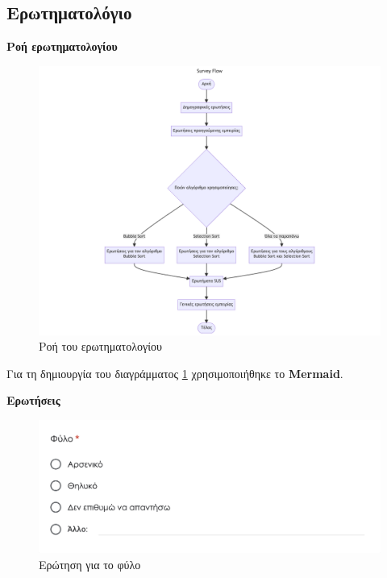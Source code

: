 {}
\subsection*{Ερωτηματολόγιο}


\textbf{Ροή ερωτηματολογίου}

\begin{figure}[H]
    \centering
    \includegraphics[width=1\linewidth]{sections/appendices/b/images/survey_flow}
    \caption{Ροή του ερωτηματολογίου}
    \label{fig:survey_flow}
\end{figure}

Για τη δημιουργία του διαγράμματος \ref{fig:survey_flow} χρησιμοποιήθηκε το \textbf{Mermaid}\cite{noauthor_mermaid_nodate}.


\textbf{Ερωτήσεις}

\begin{figure}[H]
    \centering
    \includegraphics[width=0.8\linewidth]{sections/appendices/b/images/survey_gender}
    \caption{Ερώτηση για το φύλο}
    \label{fig:survey_gender}
\end{figure}

